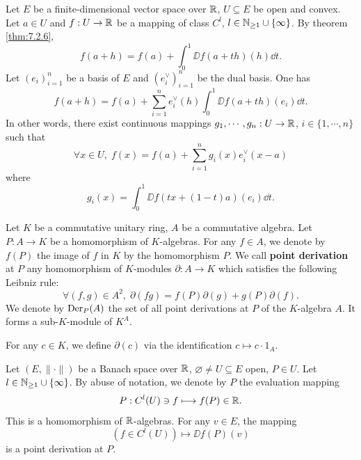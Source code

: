 \begin{remark}
    Let $E$ be a finite-dimensional vector space over $\mathbb{R}$,
    $U \subseteq E$ be open and convex.
    Let $a \in U$ and $f : U \rightarrow \mathbb{R}$ be a mapping of class $C^{l}$, $l \in \mathbb{N}_{\ge 1} \cup \{\infty\}$.
    By theorem \ref{thm:7.2.6},
    $$f(a + h) = f(a) + \int_{0}^{1} \DD f(a + th)(h) \dd t.$$
    Let $(e_i)_{i=1}^{n}$ be a basis of $E$ and $(e_i^\vee)_{i=1}^{n}$ be the dual basis.
    One has
    $$f(a + h) = f(a) + \sum_{i=1}^{n} e_i^\vee (h) \int_{0}^{1} \DD f(a + th)(e_i) \dd t.$$
    In other words, there exist continuous mappings $g_1,\cdots,g_n : U \rightarrow \mathbb{R}$, $i \in \{1,\cdots,n\}$ such that
    $$\forall x \in U,\; f(x) = f(a) + \sum_{i=1}^{n} g_i(x) e^\vee_i (x - a)$$
    where
    $$g_i(x) = \int_{0}^{1} \DD f(tx + (1-t)a)(e_i) \dd t.$$
\end{remark}

\begin{definitionenv}
    Let $K$ be a commutative unitary ring,
    $A$ be a commutative algebra.
    Let $P : A \rightarrow K$ be a homomorphism of $K$-algebras.
    For any $f \in A$, we denote by $f(P)$ the image of $f$ in $K$ by the homomorphism $P$.
    We call \textbf{point derivation} at $P$ any homomorphism of $K$-modules $\partial : A \rightarrow K$ which satisfies the following Leibniz rule:
    $$\forall (f,g) \in A^2,\; \partial(fg) = f(P) \partial(g) + g(P) \partial(f).$$
    We denote by $\operatorname{\mathrm{Der}}_P(A)$ the set of all point derivations at $P$ of the $K$-algebra $A$.
    It forms a sub-$K$-module of $K^A$.

    \quad For any $c \in K$, we define $\partial(c)$ via the identification $c \mapsto c\cdot 1_A$.
\end{definitionenv}

\begin{exampleenv}
    Let $(E,\|\cdot\|)$ be a Banach space over $\mathbb{R}$, $\varnothing \neq U \subseteq E$ open, $P \in U$.
    Let $l \in \mathbb{N}_{\ge 1} \cup \{\infty\}$.
    By abuse of notation, we denote by $P$ the evaluation mapping
    $$P : C^l(U) \ni f \longmapsto f(P) \in \mathbb{R}.$$
    This is a homomorphism of $\mathbb{R}$-algebras.
    For any $v \in E$, the mapping
    $$\left(f \in C^l(U)\right) \mapsto \DD f(P)(v)$$
    is a point derivation at $P$.
\end{exampleenv}


